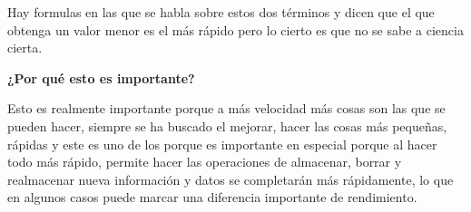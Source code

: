 \documentclass{article}
\begin{document}
Hay formulas en las que se habla sobre estos dos términos y dicen que el que obtenga un valor menor es el más rápido pero lo cierto es que no se sabe a ciencia cierta.

    \vspace{0.8cm}
    
        \textbf{¿Por qué esto es importante?}
        
    \vspace{0.8cm}
    Esto es realmente importante porque a más velocidad más cosas son las que se pueden hacer, siempre se ha buscado el mejorar, hacer las cosas más pequeñas, rápidas y este es uno de los porque es importante en especial porque al hacer todo más rápido, permite hacer las  operaciones de almacenar, borrar y realmacenar nueva información y datos se completarán más rápidamente, lo que en algunos casos puede marcar una diferencia importante de rendimiento.


\end{document}
